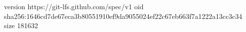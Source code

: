 version https://git-lfs.github.com/spec/v1
oid sha256:1646cd7de67eca3b80551910ef9da9055024ef22c67eb663f7a1222a13cc3c34
size 181632
